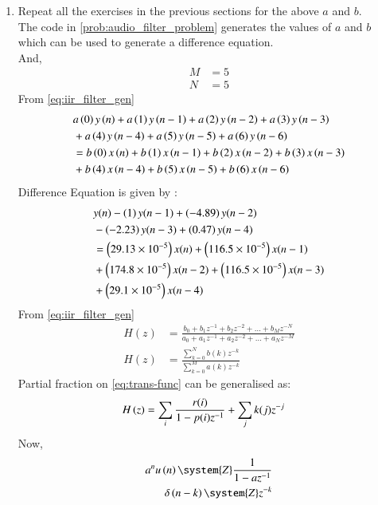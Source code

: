 \documentclass[journal,12pt,twocolumn]{IEEEtran}
\theoremstyle{remark}
\begin{document}
\begin{enumerate}[label=\thesection.\arabic*
,ref=\thesection.\theenumi]
\begin{enumerate}[label=\thesection.\arabic*
,ref=\thesection.\theenumi]
\item Repeat all the exercises in the previous sections for the above $a$ and $b$.\\
\solution The code in \ref{prob:audio_filter_problem} generates the values of $a$ and $b$  which can be used to generate a difference equation.\\
And,
\begin{align}
    M &= 5\\
    N&=5
\end{align}
From \ref{eq:iir_filter_gen} 
\begin{align}
    &a\left(0\right)y\left(n\right) + a\left(1\right)y\left(n-1\right)+a\left(2\right)y\left(n-2\right)+a\left(3\right)y\left(n-3\right) \\ 
    &+ a\left(4\right)y\left(n-4\right) + a\left(5\right)y\left(n-5\right) + a\left(6\right)y\left(n-6\right) \\
    &=   b\left(0\right)x\left(n\right) + b\left(1\right)x\left(n-1\right)+b\left(2\right)x\left(n-2\right)+b\left(3\right)x\left(n-3\right) \\
    &+ b\left(4\right)x\left(n-4\right) + b\left(5\right)x\left(n-5\right) + b\left(6\right)x\left(n-6\right) 
\end{align}
Difference Equation is given by :
\begin{align}
	&y(n) - \left(1\right)y(n - 1) + \left(-4.89\right)y(n - 2) \nonumber \\
	&- \left(-2.23\right)y(n - 3) + \left(0.47\right)y(n - 4) \nonumber \\
	&= \left(29.13\times 10^{-5}\right)x(n) + \left(116.5\times 10^{-5}\right)x(n - 1) \nonumber \\
	&+ \left(174.8 \times 10^{-5}\right)x(n - 2) + \left(116.5 \times 10^{-5}\right)x(n - 3) \nonumber \\
	&+ \left(29.1 \times 10^{-5}\right)x(n - 4)
\end{align}
From \eqref{eq:iir_filter_gen} 
\begin{align}
    H(z) &= \frac{b_0 + b_1 z^{-1} + b_2 z^{-2} + \ldots + b_M z^{-N}}{a_0 + a_1 z^{-1} + a_2 z^{-2} + \ldots + a_N z^{-M}}\\
    H(z) &= \frac{\sum_{k = 0}^{N}b(k)z^{-k}}{\sum_{k = 0}^{M}a(k)z^{-k}} \label{eq:trans-func}
\end{align}
Partial fraction on \eqref{eq:trans-func} can be generalised as:
\begin{align}
    H\left(z\right)&= \sum_{i}\frac{r(i)}{1 - p(i)z^{-1}} + \sum_{j}k(j)z^{-j}
	\label{eq:trans-func-pfe}
\end{align}
Now,
\begin{align}
a^{n}u\brak{n} \system{Z} \frac{1}{1-az^{-1}} \label{eq:res-1}\\
    \delta\brak{n-k} \system{Z} z^{-k}\label{eq:res-2}

\end{align}
\end{enumerate}
\end{enumerate}
\end{document}
